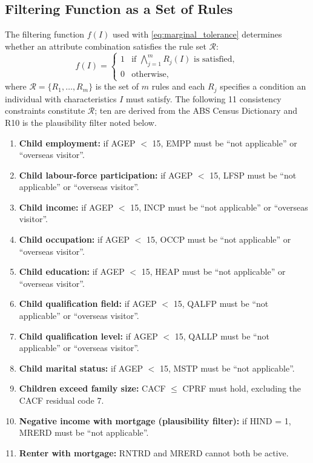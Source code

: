 \documentclass[review]{elsarticle}
\begin{document}
\subsection{Filtering Function as a Set of Rules}
\label{sec:ref}
The filtering function $f(I)$ used with \cref{eq:marginal_tolerance} determines whether an attribute combination satisfies the rule set $\mathcal{R}$:
\[
f(I) = \begin{cases} 1 & \text{if } \bigwedge_{j=1}^{m} R_j(I) \text{ is satisfied}, \\ 0 & \text{otherwise}, \end{cases}
\]
where $\mathcal{R}=\{R_1,\dots,R_m\}$ is the set of $m$ rules and each $R_j$ specifies a condition an individual with characteristics $I$ must satisfy. The following 11 consistency constraints constitute $\mathcal{R}$; ten are derived from the ABS Census Dictionary and R10 is the plausibility filter noted below.

\begin{enumerate}[label=\textbf{R\arabic*}, ref=R\arabic*, leftmargin=*]
    \item \textbf{Child employment:} if AGEP $<$ 15, EMPP must be ``not applicable'' or ``overseas visitor''.
    \item \textbf{Child labour-force participation:} if AGEP $<$ 15, LFSP must be ``not applicable'' or ``overseas visitor''.
    \item \textbf{Child income:} if AGEP $<$ 15, INCP must be ``not applicable'' or ``overseas visitor''.
    \item \textbf{Child occupation:} if AGEP $<$ 15, OCCP must be ``not applicable'' or ``overseas visitor''.
    \item \textbf{Child education:} if AGEP $<$ 15, HEAP must be ``not applicable'' or ``overseas visitor''.
    \item \textbf{Child qualification field:} if AGEP $<$ 15, QALFP must be ``not applicable'' or ``overseas visitor''.
    \item \textbf{Child qualification level:} if AGEP $<$ 15, QALLP must be ``not applicable'' or ``overseas visitor''.
    \item \textbf{Child marital status:} if AGEP $<$ 15, MSTP must be ``not applicable''.
    \item \textbf{Children exceed family size:} CACF $\le$ CPRF must hold, excluding the CACF residual code 7.
    \item \textbf{Negative income with mortgage (plausibility filter):} if HIND = 1, MRERD must be ``not applicable''.
    \item \textbf{Renter with mortgage:} RNTRD and MRERD cannot both be active.
\end{enumerate}
\end{document}
